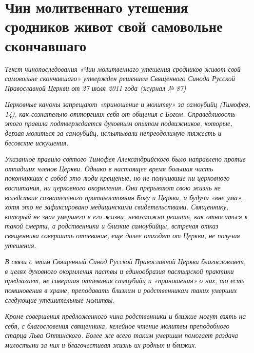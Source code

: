 \mychapterending

\label{chap:Uteshenie-srodnikam-samoubiits}

\section{Чин молитвеннаго утешения сродников живот свой самовольне скончавшаго}\begin{mymulticols}


{\itshape Текст чинопоследования «Чин молитвеннаго утешения сродников живот свой самовольне скончавшаго» утвержден решением Священного Синода Русской Православной Церкви от 27 июля 2011 года (журнал № 87)}

{\itshape Церковные каноны запрещают «приношение и молитву» за самоубийц (Тимофея, 14), как сознательно отторгших себя от общения с Богом. Справедливость этого правила подтверждается духовным опытом подвижников, которые, дерзая молиться за самоубийц, испытывали непреодолимую тяжесть и бесовские искушения.}

{\itshape Указанное правило святого Тимофея Александрийского было направлено против отпадших членов Церкви. Однако в настоящее время большая часть покончивших с собой это люди крещеные, но не получившие ни церковного воспитания, ни церковного окормления. Они прерывают свою жизнь не вследствие сознательного противостояния Богу и Церкви, а будучи «вне ума», хотя это не зафиксировано медицинскими свидетельствами. Священнику, который не знал умершего в его жизни, невозможно решить, как относиться к такой смерти, а родственники и близкие самоубийцы, встречая отказ священника совершить отпевание, еще далее отходят от Церкви, не получая утешения.}

{\itshape В связи с этим Священный Синод Русской Православной Церкви благословляет, в целях духовного окормления паствы и единообразия пастырской практики предлагает, не совершая отпевания самоубийц и «приношения» о них, то есть поминовения в храме, преподавать близким и родственникам таких умерших следующие утешительные молитвы.}

{\itshape Кроме совершения предложенного чина родственники и близкие могут взять на себя, с благословения священника, келейное чтение молитвы преподобного старца Льва Оптинского. Более же всего таким умершим помогает раздача милостыни за них и благочестивая жизнь их родных и близких.}


\end{mymulticols}
